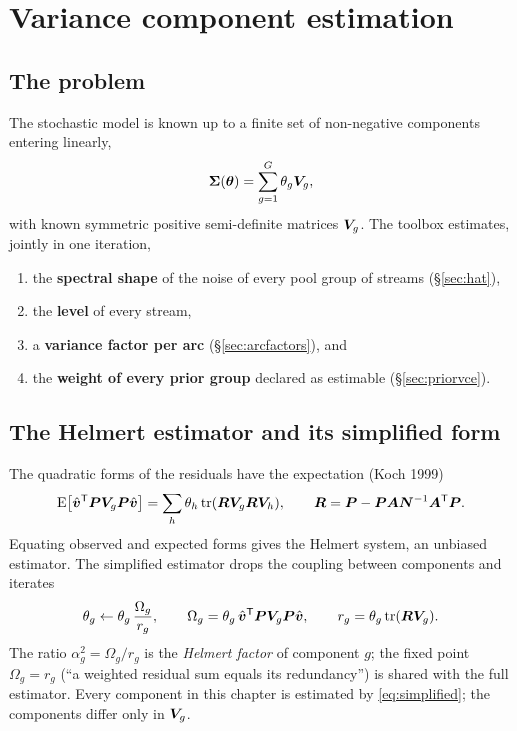 \chapter{Variance component estimation}\label{ch:vce}

\section{The problem}

The stochastic model is known up to a finite set of non-negative components entering linearly,
\begin{equation}\label{eq:vcmodel}
\bm{\Sigma}(\bm{\theta})=\sum_{g=1}^G\theta_g\bm{V}_g ,
\end{equation}
with known symmetric positive semi-definite matrices $\bm{V}_g$. The toolbox estimates, jointly
in one iteration,
\begin{enumerate}[label=(\alph*)]
\item the \textbf{spectral shape} of the noise of every pool group of streams
  (\S\ref{sec:hat}),
\item the \textbf{level} of every stream,
\item a \textbf{variance factor per arc} (\S\ref{sec:arcfactors}), and
\item the \textbf{weight of every prior group} declared as estimable (\S\ref{sec:priorvce}).
\end{enumerate}

\section{The Helmert estimator and its simplified form}\label{sec:helmert}

The quadratic forms of the residuals have the expectation (Koch 1999)
\begin{equation}\label{eq:helmert}
\operatorname{E}\bigl[\hat{\bm{v}}^{\mathsf T}\bm{P}\bm{V}_g\bm{P}\hat{\bm{v}}\bigr]=\sum_h\theta_h\operatorname{tr}(\bm{R}\bm{V}_g\bm{R}\bm{V}_h),\qquad
\bm{R}=\bm{P}-\bm{P}\bm{A}\bm{N}^{-1}\bm{A}^{\mathsf T}\bm{P} .
\end{equation}
Equating observed and expected forms gives the Helmert system, an unbiased estimator. The
simplified estimator drops the coupling between components and iterates
\begin{equation}\label{eq:simplified}
\theta_g\leftarrow\theta_g\,\frac{\Omega_g}{r_g},\qquad
\Omega_g=\theta_g\,\hat{\bm{v}}^{\mathsf T}\bm{P}\bm{V}_g\bm{P}\hat{\bm{v}},\qquad
r_g=\theta_g\operatorname{tr}(\bm{R}\bm{V}_g).
\end{equation}
The ratio $\alpha_g^2=\Omega_g/r_g$ is the \emph{Helmert factor} of component $g$; the fixed
point $\Omega_g=r_g$ (``a weighted residual sum equals its redundancy'') is shared with the full
estimator. Every component in this chapter is estimated by \eqref{eq:simplified}; the components
differ only in $\bm{V}_g$.

